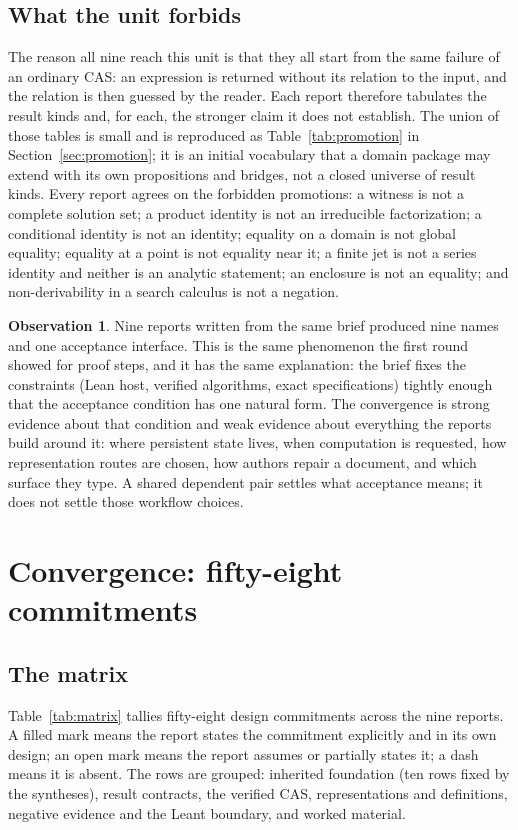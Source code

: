 \documentclass[11pt,a4paper]{article}
\theoremstyle{definition}
\newtheorem{observation}{Observation}[section]
\begin{document}
\subsection{What the unit forbids}
The reason all nine reach this unit is that they all start from the same failure of an ordinary CAS: an expression is returned without its relation to the input, and the relation is then guessed by the reader. Each report therefore tabulates the result kinds and, for each, the stronger claim it does not establish. The union of those tables is small and is reproduced as Table~\ref{tab:promotion} in Section~\ref{sec:promotion}; it is an initial vocabulary that a domain package may extend with its own propositions and bridges, not a closed universe of result kinds. Every report agrees on the forbidden promotions: a witness is not a complete solution set; a product identity is not an irreducible factorization; a conditional identity is not an identity; equality on a domain is not global equality; equality at a point is not equality near it; a finite jet is not a series identity and neither is an analytic statement; an enclosure is not an equality; and non-derivability in a search calculus is not a negation.

\begin{observation}
Nine reports written from the same brief produced nine names and one acceptance interface. This is the same phenomenon the first round showed for proof steps, and it has the same explanation: the brief fixes the constraints (Lean host, verified algorithms, exact specifications) tightly enough that the acceptance condition has one natural form. The convergence is strong evidence about that condition and weak evidence about everything the reports build around it: where persistent state lives, when computation is requested, how representation routes are chosen, how authors repair a document, and which surface they type. A shared dependent pair settles what acceptance means; it does not settle those workflow choices.
\end{observation}

\section{Convergence: fifty-eight commitments}\label{sec:convergence}

\subsection{The matrix}
Table~\ref{tab:matrix} tallies fifty-eight design commitments across the nine reports. A filled mark means the report states the commitment explicitly and in its own design; an open mark means the report assumes or partially states it; a dash means it is absent. The rows are grouped: inherited foundation (ten rows fixed by the syntheses), result contracts, the verified CAS, representations and definitions, negative evidence and the Leant boundary, and worked material.
\end{document}
